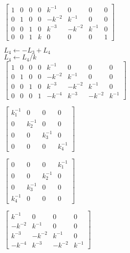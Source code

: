 \begin{exercice}
\begin{sol}
\begin{enumerate}
\begin{multicols}{2}
        $%
        \left[
          \begin{array}{rrrr|rrrr}
            1 & 0 & 0 & 0 &  k^{-1} &      0 &      0 & 0 \\
            0 & 1 & 0 & 0 & -k^{-2} &  k^{-1} &     0 & 0 \\
            0 & 0 & 1 & 0 &  k^{-3} & -k^{-2} & k^{-1} & 0 \\
            0 & 0 & 1 & k &       0 &      0 & 0 & 1
          \end{array}
        \right]
        $
      \end{multicols}
      \begin{multicols}{2}
        $L_4 \leftarrow - L_3 + L_4$ \\
        $L_4 \leftarrow L_4/k$ \\
        \columnbreak
        $%
        \left[
          \begin{array}{rrrr|rrrr}
            1 & 0 & 0 & 0 &  k^{-1} &      0 &       0 & 0 \\
            0 & 1 & 0 & 0 & -k^{-2} &  k^{-1} &      0 & 0 \\
            0 & 0 & 1 & 0 &  k^{-3} & -k^{-2} &  k^{-1} & 0 \\
            0 & 0 & 0 & 1 & -k^{-4} &  k^{-3} & -k^{-2} & k^{-1}
          \end{array}
        \right]
        $
      \end{multicols}
      \setlength{\columnsep}{\ocolumnsep}
    \end{enumerate}
  \end{sol}
  \begin{rep}
    \raggedright
    \begin{inparaenum}
    \item $%
      \begin{bmatrix}
        k_1^{-1} & 0 & 0 & 0 \\
        0 & k_2^{-1} & 0 & 0 \\
        0 & 0 & k_3^{-1} & 0 \\
        0 & 0 & 0 & k_4^{-1}
      \end{bmatrix}$
    \item $%
      \begin{bmatrix}
        0 & 0 & 0 & k_1^{-1} \\
        0 & 0 & k_2^{-1} & 0 \\
        0 & k_3^{-1} & 0 & 0 \\
        k_4^{-1} & 0 & 0 & 0
      \end{bmatrix}$
    \item $%
      \begin{bmatrix}
        k^{-1} & 0 & 0 & 0 \\
        -k^{-2} & k^{-1} & 0 & 0 \\
        k^{-3} & -k^{-2} & k^{-1} & 0 \\
        -k^{-4} & k^{-3} & -k^{-2} & k^{-1}
      \end{bmatrix}$
    \end{inparaenum}
  \end{rep}
\end{exercice}

